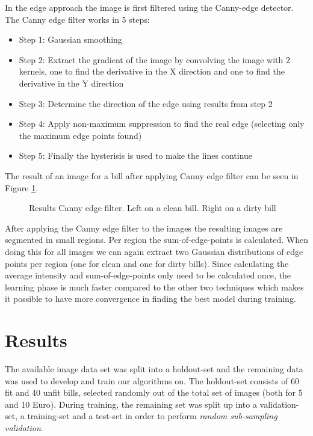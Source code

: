 \documentclass[11pt,twocolumn]{article}
\begin{document}
			In the edge approach the image is first filtered using the Canny-edge detector. The Canny edge filter works in 5 steps: 
			
			\begin{itemize} 
				\item Step 1: Gaussian smoothing 
				\item Step 2: Extract the gradient of the image by convolving the image with 2 kernels, one to find the derivative in the X direction and one to find the derivative in the Y direction				
				\item Step 3: Determine the direction of the edge using results from step 2  
				\item Step 4: Apply non-maximum suppression to find the real edge (selecting only the maximum edge points found)
				\item Step 5: Finally the hysterisis is used to make the lines continue
            \end{itemize} 
            
            The result of an image for a bill after applying Canny edge filter
            can be seen in Figure \ref{canny5Euro}.
            
            \begin{figure}[!hbtp]
				\centering 
				\caption{Results Canny edge filter. Left on a clean bill. Right on a dirty bill} 
				\label{canny5Euro} 
			\end{figure} 
			
			After applying the Canny edge filter to the images the resulting images are segmented in small regions. Per region the sum-of-edge-points is calculated. When doing this for all images we can again extract two Gaussian distributions of edge points per region (one for clean and one for dirty bills). Since calculating the average intensity and sum-of-edge-points only need to be calculated once, the learning phase is much faster compared to the other two techniques which makes it possible to have more convergence in finding the best model during training.
			
	\section{Results}\label{sec:results}
		The available image data set was split into a holdout-set and the remaining data was used to develop and train our algorithms on. The holdout-set consists of 60 fit and 40 unfit bills, selected randomly out of the total set of images (both for 5 and 10 Euro). During training, the remaining set was split up into a validation-set, a training-set and a test-set in order to perform \emph{random sub-sampling validation}.
\end{document}
